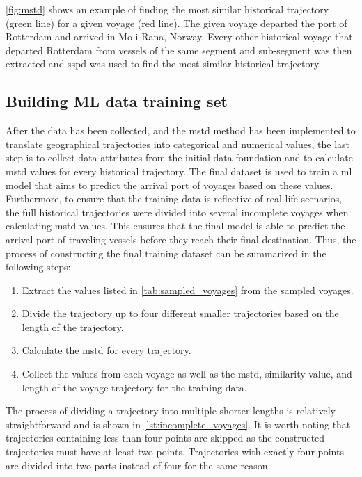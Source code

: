\cref{fig:mstd} shows an example of finding the most similar historical trajectory (green line) for a given voyage (red line). The given voyage departed the port of Rotterdam and arrived in Mo i Rana, Norway. Every other historical voyage that departed Rotterdam from vessels of the same segment and sub-segment was then extracted and \acrshort{sspd} was used to find the most similar historical trajectory.

\subsection{Building ML data training set}

After the data has been collected, and the \acrshort{mstd} method has been implemented to translate geographical trajectories into categorical and numerical values, the last step is to collect data attributes from the initial data foundation and to calculate \acrshort{mstd} values for every historical trajectory. The final dataset is used to train a \acrfull{ml} model that aims to predict the arrival port of voyages based on these values. Furthermore, to ensure that the training data is reflective of real-life scenarios, the full historical trajectories were divided into several incomplete voyages when calculating \acrshort{mstd} values. This ensures that the final model is able to predict the arrival port of traveling vessels before they reach their final destination. Thus, the process of constructing the final training dataset can be summarized in the following steps:

\begin{enumerate}
    \item Extract the values listed in \cref{tab:sampled_voyages} from the sampled voyages.
    \item Divide the trajectory up to four different smaller trajectories based on the length of the trajectory.
    \item Calculate the \acrshort{mstd} for every trajectory.
    \item Collect the values from each voyage as well as the \acrshort{mstd}, similarity value, and length of the voyage trajectory for the training data.
\end{enumerate}

The process of dividing a trajectory into multiple shorter lengths is relatively straightforward and is shown in \cref{lst:incomplete_voyages}. It is worth noting that trajectories containing less than four points are skipped as the constructed trajectories must have at least two points. Trajectories with exactly four points are divided into two parts instead of four for the same reason.

